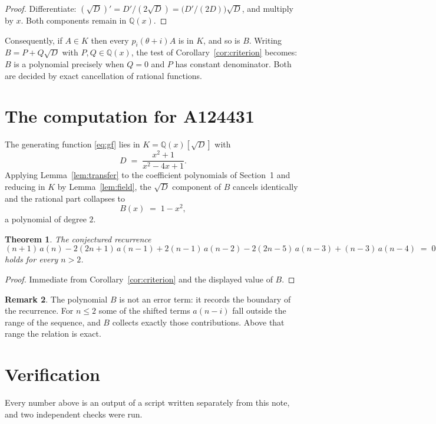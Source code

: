 \documentclass[11pt,a4paper]{article}
\theoremstyle{plain}
\newtheorem{theorem}{Theorem}
\theoremstyle{definition}
\newtheorem{remark}[theorem]{Remark}
\begin{document}
\begin{proof}
Differentiate: $(\sqrt{D})'=D'/(2\sqrt{D})=\bigl(D'/(2D)\bigr)\sqrt{D}$, and multiply by
$x$. Both components remain in $\mathbb{Q}(x)$.
\end{proof}

Consequently, if $A\in K$ then every $p_{i}(\theta+i)A$ is in $K$, and so is $B$. Writing
$B=P+Q\sqrt{D}$ with $P,Q\in\mathbb{Q}(x)$, the test of Corollary~\ref{cor:criterion}
becomes: $B$ is a polynomial precisely when $Q=0$ and $P$ has constant denominator. Both
are decided by exact cancellation of rational functions.

\section{The computation for A124431}

The generating function \eqref{eq:gf} lies in $K=\mathbb{Q}(x)[\sqrt{D}]$ with
\[
D \;=\; \frac{x^{2} + 1}{x^{2} - 4 x + 1} .
\]
Applying Lemma~\ref{lem:transfer} to the coefficient polynomials of Section~1 and reducing
in $K$ by Lemma~\ref{lem:field}, the $\sqrt{D}$ component of $B$ cancels identically and
the rational part collapses to
\[
B(x)\;=\;1 - x^{2} ,
\]
a polynomial of degree $2$.

\begin{theorem}
The conjectured recurrence
\[
(n + 1)\,a(n) -  2 \left(2 n + 1\right)\,a(n-1) + 2 \left(n - 1\right)\,a(n-2) -  2 \left(2 n - 5\right)\,a(n-3) + (n - 3)\,a(n-4) \;=\;0
\]
holds for every $n>2$.
\end{theorem}

\begin{proof}
Immediate from Corollary~\ref{cor:criterion} and the displayed value of $B$.
\end{proof}

\begin{remark}
The polynomial $B$ is not an error term: it records the boundary of the recurrence. For
$n\le2$ some of the shifted terms $a(n-i)$ fall outside the range of the sequence,
and $B$ collects exactly those contributions. Above that range the relation is exact.
\end{remark}

\section{Verification}

Every number above is an output of a script written separately from this note, and two
independent checks were run.
\end{document}
